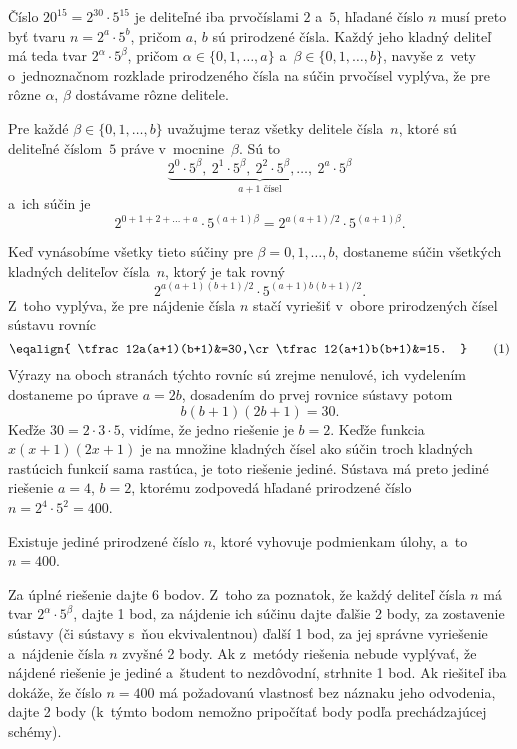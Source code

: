 {%
Číslo $20^{15}=2^{30}\cdot5^{15}$ je deliteľné iba prvočíslami $2$ a~$5$, hľadané
číslo $n$ musí preto byť tvaru $n=2^a\cdot5^b$, pričom $a$, $b$ sú prirodzené čísla. Každý jeho
kladný deliteľ má teda tvar $2^\alpha\cdot5^\beta$, pričom $\alpha\in\{0,1,\dots,a\}$
a~$\beta\in\{0,1,\dots,b\}$, navyše z~vety o~jednoznačnom rozklade prirodzeného čísla na
súčin prvočísel vyplýva, že pre rôzne $\alpha$, $\beta$ dostávame rôzne delitele.

Pre každé $\beta\in\{0,1,\dots,b\}$
uvažujme teraz všetky delitele čísla~$n$, ktoré sú deliteľné číslom~$5$ práve
v~mocnine~$\beta$. Sú to
$$
\underbrace{2^0\cdot5^\beta,\ 2^1\cdot5^\beta,\ 2^2\cdot5^\beta,\dots,\ 2^a\cdot5^\beta}_
{a+1 \text{ čísel}}
$$
a~ich súčin je
$$
2^{0+1+2+\dots+a}\cdot5^{(a+1)\beta}=2^{a(a+1)/2}\cdot5^{(a+1)\beta}.
$$

Keď vynásobíme všetky tieto súčiny pre $\beta=0,1,\dots,b$, dostaneme súčin všetkých
kladných deliteľov čísla~$n$, ktorý je tak rovný
$$
2^{a(a+1)(b+1)/2}\cdot5^{(a+1)b(b+1)/2}.
$$
Z~toho vyplýva, že pre nájdenie čísla $n$ stačí vyriešiť v~obore prirodzených čísel
sústavu rovníc
$$
\eqalign{
\tfrac12a(a+1)(b+1)&=30,\cr
\tfrac12(a+1)b(b+1)&=15.
}\tag1
$$
Výrazy na oboch stranách týchto rovníc sú zrejme nenulové, ich vydelením dostaneme
po úprave $a=2b$, dosadením do prvej rovnice sústavy potom
$$
b(b+1)(2b+1)=30.
$$
Keďže $30=2\cdot3\cdot 5$, vidíme, že jedno riešenie je $b=2$. Keďže funkcia
$x(x+1)(2x+1)$ je na množine kladných čísel ako súčin troch kladných rastúcich funkcií
sama rastúca, je toto riešenie jediné.
Sústava  má preto jediné riešenie $a=4$, $b=2$, ktorému zodpovedá hľadané
prirodzené číslo $n=2^4\cdot5^2=400$.

\medskip
Existuje jediné prirodzené číslo $n$, ktoré vyhovuje podmienkam úlohy, a~to $n=400$.


\nobreak\medskip\petit\noindent
Za úplné riešenie dajte 6 bodov.
Z~toho za poznatok, že každý deliteľ čísla $n$
má tvar $2^\alpha\cdot5^\beta$, dajte 1 bod, za nájdenie ich súčinu dajte ďalšie 2
body, za zostavenie sústavy  (či sústavy s~ňou ekvivalentnou) ďalší 1 bod,
za jej správne vyriešenie a~nájdenie čísla $n$ zvyšné 2 body. Ak z~metódy riešenia
 nebude vyplývať, že nájdené riešenie je jediné a~študent to nezdôvodní,
strhnite 1 bod. Ak riešiteľ iba dokáže, že číslo $n=400$ má požadovanú vlastnosť
bez náznaku jeho odvodenia, dajte 2 body (k~týmto bodom nemožno pripočítať body podľa
prechádzajúcej schémy).
\endpetit
\bigbreak}


